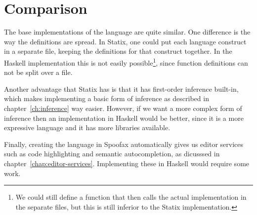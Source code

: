\section{Comparison}

The base implementations of the language are quite similar. One difference is the way the definitions are spread. In Statix, one could put each language construct in a separate file, keeping the definitions for that construct together. In the Haskell implementation this is not easily possible\footnote{We could still define a function that then calls the actual implementation in the separate files, but this is still inferior to the Statix implementation.}, since function definitions can not be split over a file. 

Another advantage that Statix has is that it has first-order inference built-in, which makes implementing a basic form of inference as described in chapter~\ref{ch:inference} way easier. However, if we want a more complex form of inference then an implementation in Haskell would be better, since it is a more expressive language and it has more libraries available. 

Finally, creating the language in Spoofax automatically gives us editor services such as code highlighting and semantic autocompletion, as dicusssed in chapter~\ref{chap:editor-services}. Implementing these in Haskell would require some work.
